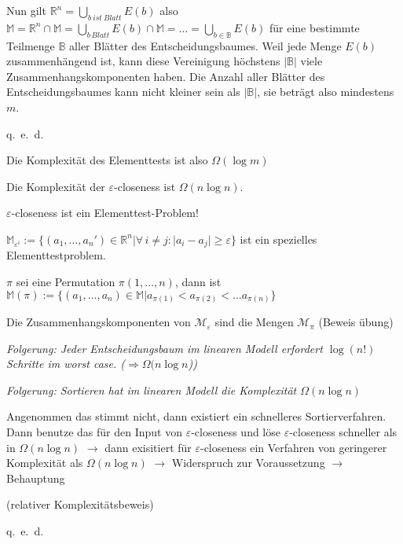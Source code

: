 \begin{beweis}
Nun  gilt \(\mathbb{R}^n = \bigcup_{b \ ist\ Blatt} E(b)\) also
\( \mathbb{M} = \mathbb{R}^n \cap \mathbb{M} = \bigcup_{b \, Blatt} E(b) \cap \mathbb{M} = \dots = \bigcup_{b \in \mathbb{B}} E(b) \)
für eine bestimmte Teilmenge $\mathbb{B}$ aller Blätter des Entscheidungsbaumes. Weil jede Menge $E(b)$ zusammenhängend ist, kann
diese Vereinigung höchstens $\vert\mathbb{B}\vert$ viele Zusammenhangskomponenten haben. Die Anzahl aller Blätter des
Entscheidungsbaumes kann nicht kleiner sein als $\vert\mathbb{B}\vert$, sie beträgt also mindestens $m$.

\hfill q.~e.~d. 

Die Komplexität des Elementtests ist also \( \Omega (\log m) \)	
  \begin{satz}
  Die Komplexität der $\varepsilon$-closeness ist \( \Omega (n \log n) \).
  \end{satz}

  \begin{beweis}
  $\varepsilon$-closeness ist ein Elementtest-Problem!

  \( \mathbb{M}_{\varepsilon^i} := \lbrace ( a_1, \dots , a_n ') \in \mathbb{R}^n \vert \forall \, i \ne j : \vert a_i - a_j 
  \vert \geq \varepsilon \rbrace\) ist ein spezielles Elementtestproblem.
				
  $\pi$ sei eine Permutation \( \pi(1, \dots ,n) \), dann ist
  \( \mathbb{M}(\pi ) := \lbrace (a_1, \dots , a_n) \in \mathbb{M} \vert a_{\pi (1)} < a_{\pi (2)} < \dots a_{\pi (n)}  \rbrace \)
	
	
  \begin{satz} 
  Die Zusammenhangskomponenten von \( \mathcal{M}_\varepsilon \) sind die Mengen \( \mathcal{M}_\pi  \) (\textup{Beweis übung})
  \end{satz}		
		
  \textit{Folgerung: Jeder Entscheidungsbaum im linearen Modell erfordert \( \log (n!) \) Schritte im worst case. 
  (\( \Rightarrow \Omega (n \log n \)))}
		
  \end{beweis}	
\textit{Folgerung: Sortieren hat im linearen Modell die Komplexität \( \Omega (n \log n) \)}
\bigskip
	
Angenommen das stimmt nicht, dann existiert ein schnelleres Sortierverfahren. 
Dann benutze das für den Input von $\varepsilon$-closeness und löse $\varepsilon$-closeness schneller als in \( \Omega (n \log n)\)
\( \rightarrow \) dann exisitiert für $\varepsilon$-closeness ein Verfahren von geringerer Komplexität als \( \Omega (n \log n) \)
\( \rightarrow \) Widerspruch zur Voraussetzung \( \rightarrow \) Behauptung
		
(relativer Komplexitätsbeweis)

\hfill q.~e.~d.
\end{beweis}


